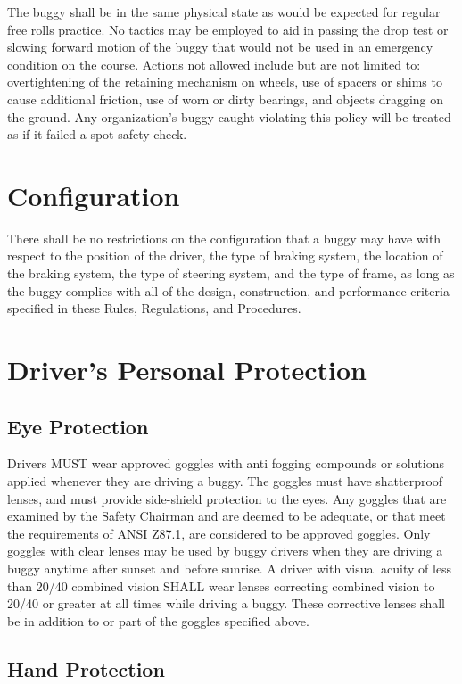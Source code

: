 	The buggy shall be in the same physical state as would be expected for regular
	free rolls practice. No tactics may be employed to aid in passing the drop test
	or slowing forward motion of the buggy that would not be used in an emergency
	condition on the course. Actions not allowed include but are not limited to:
	overtightening of the retaining mechanism on wheels, use of spacers or shims to
	cause additional friction, use of worn or dirty bearings, and objects dragging
	on the ground. Any organization's buggy caught violating this policy will be
	treated as if it failed a spot safety check.


\section{Configuration}

	There shall be no restrictions on the configuration that a buggy may have with
	respect to the position of the driver, the type of braking system, the location
	of the braking system, the type of steering system, and the type of frame, as
	long as the buggy complies with all of the design, construction, and
	performance criteria specified in these Rules, Regulations, and Procedures.

\section{Driver's Personal Protection}

\subsection{Eye Protection}

	Drivers MUST wear approved goggles with anti fogging compounds or solutions
	applied whenever they are driving a buggy. The goggles must have shatterproof
	lenses, and must provide side-shield protection to the eyes. Any goggles that
	are examined by the Safety Chairman and are deemed to be adequate, or that meet
	the requirements of ANSI Z87.1, are considered to be approved goggles. Only
	goggles with clear lenses may be used by buggy drivers when they are driving
	a buggy anytime after sunset and before sunrise.
    A driver with visual acuity of less than 20/40 combined vision SHALL wear
    lenses correcting combined vision to 20/40 or greater at all times while
    driving a buggy. These corrective lenses shall be in addition to or part of the goggles specified above.

\subsection{Hand Protection}

